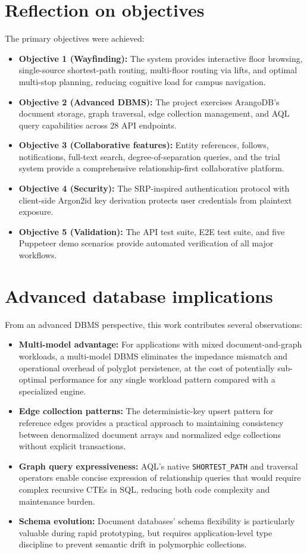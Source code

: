 \documentclass[13pt,a4paper]{report}
\begin{document}
\section{Reflection on objectives}
The primary objectives were achieved:
\begin{itemize}
    \item \textbf{Objective 1 (Wayfinding):} The system provides interactive floor browsing, single-source shortest-path routing, multi-floor routing via lifts, and optimal multi-stop planning, reducing cognitive load for campus navigation.
    \item \textbf{Objective 2 (Advanced DBMS):} The project exercises ArangoDB's document storage, graph traversal, edge collection management, and AQL query capabilities across 28 API endpoints.
    \item \textbf{Objective 3 (Collaborative features):} Entity references, follows, notifications, full-text search, degree-of-separation queries, and the trial system provide a comprehensive relationship-first collaborative platform.
    \item \textbf{Objective 4 (Security):} The SRP-inspired authentication protocol with client-side Argon2id key derivation protects user credentials from plaintext exposure.
    \item \textbf{Objective 5 (Validation):} The API test suite, E2E test suite, and five Puppeteer demo scenarios provide automated verification of all major workflows.
\end{itemize}

\section{Advanced database implications}
From an advanced DBMS perspective, this work contributes several observations:
\begin{itemize}
    \item \textbf{Multi-model advantage:} For applications with mixed document-and-graph workloads, a multi-model DBMS eliminates the impedance mismatch and operational overhead of polyglot persistence, at the cost of potentially sub-optimal performance for any single workload pattern compared with a specialized engine.
    \item \textbf{Edge collection patterns:} The deterministic-key upsert pattern for reference edges provides a practical approach to maintaining consistency between denormalized document arrays and normalized edge collections without explicit transactions.
    \item \textbf{Graph query expressiveness:} AQL's native \texttt{SHORTEST\_PATH} and traversal operators enable concise expression of relationship queries that would require complex recursive CTEs in SQL, reducing both code complexity and maintenance burden.
    \item \textbf{Schema evolution:} Document databases' schema flexibility is particularly valuable during rapid prototyping, but requires application-level type discipline to prevent semantic drift in polymorphic collections.
\end{itemize}
\end{document}

